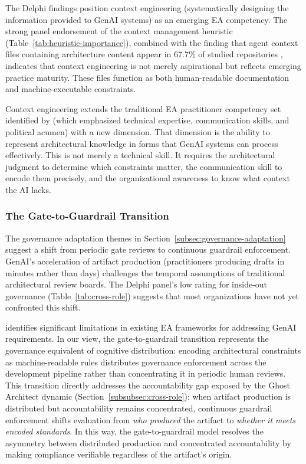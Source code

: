 The Delphi findings position context engineering (systematically designing
the information provided to GenAI systems) as an emerging EA competency.
The strong panel endorsement of the context management heuristic
(Table~\ref{tab:heuristic-importance}), combined with the finding that
agent context files containing architecture content appear in 67.7\% of
studied repositories \parencite{chatlatanagulchai_agent_readmes_2025},
indicates that context engineering is not merely aspirational but reflects
emerging practice maturity. These files function as both human-readable
documentation and machine-executable constraints.

Context engineering extends the traditional EA practitioner
competency set identified by \textcite{land_enterprise_2009} (which
emphasized technical expertise, communication skills, and political
acumen) with a new dimension. That dimension is the ability to represent
architectural knowledge in forms that GenAI systems can process
effectively. This is not
merely a technical skill. It requires the architectural judgment to determine
which constraints matter, the communication skill to encode them precisely,
and the organizational awareness to know what context the AI lacks.

\subsubsection{The Gate-to-Guardrail Transition}

The governance adaptation themes in Section~\ref{subsec:governance-adaptation}
suggest a shift from periodic gate reviews to continuous guardrail enforcement.
GenAI's acceleration of artifact production (practitioners producing drafts in
minutes rather than days) challenges the temporal assumptions of traditional
architectural review boards. The Delphi panel's low rating for inside-out governance
(Table~\ref{tab:cross-role}) suggests that most organizations have not yet
confronted this shift.

\textcite{ettinger_ea_dynamic_capability_2025} identifies significant
limitations in existing EA frameworks for addressing GenAI requirements. In our
view, the gate-to-guardrail transition represents the governance equivalent of
cognitive distribution: encoding architectural constraints as machine-readable
rules distributes governance enforcement across the development pipeline rather
than concentrating it in periodic human reviews. This transition directly
addresses the accountability gap exposed by the Ghost Architect dynamic
(Section~\ref{subsubsec:cross-role}): when artifact production is distributed
but accountability remains concentrated, continuous guardrail enforcement shifts
evaluation from \textit{who produced} the artifact to \textit{whether it meets
encoded standards}. In this way, the gate-to-guardrail model resolves the
asymmetry between distributed production and concentrated accountability by
making compliance verifiable regardless of the artifact's origin.

